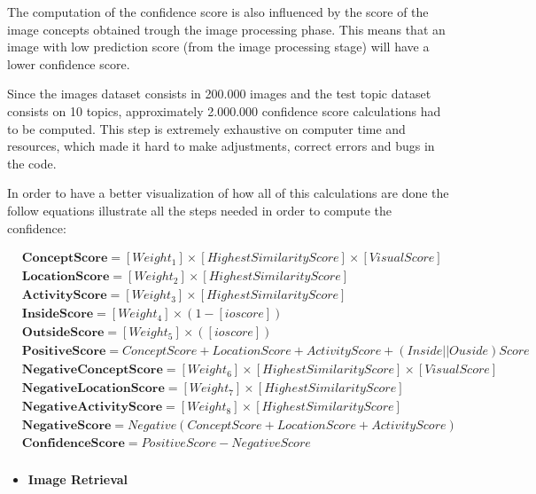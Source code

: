     The computation of the confidence score is also influenced by the score of the image concepts obtained trough the image processing phase. This means that an image with low prediction score (from the image processing stage) will have a lower confidence score. 

    Since the images dataset consists in 200.000 images and the test topic dataset consists on 10 topics, approximately 2.000.000 confidence score calculations had to be computed. This step is extremely exhaustive on computer time and resources, which made it hard to make adjustments, correct errors and bugs in the code.
        
   


    In order to have a better visualization of how all of this calculations are done the follow equations illustrate all the steps needed in order to compute the confidence:

    \begin{align*}
        &\textbf{ConceptScore}  =   [Weight_1]\times[HighestSimilarityScore]\times[VisualScore] \\ 
        &\textbf{LocationScore} = [Weight_2]\times[HighestSimilarityScore] \\ 
      &\textbf{ActivityScore} =  [Weight_3]\times[HighestSimilarityScore]\\
        &\textbf{InsideScore}   =  [Weight_4]\times(1-[ioscore])\\
        &\textbf{OutsideScore}  =  [Weight_5]\times([ioscore])\\
        &\textbf{PositiveScore}  =  ConceptScore + LocationScore + ActivityScore + (Inside||Ouside)Score\\
        &\textbf{NegativeConceptScore}  =  [Weight_6]\times[HighestSimilarityScore]\times[VisualScore]\\
        &\textbf{NegativeLocationScore}  =  [Weight_7]\times[HighestSimilarityScore]\\
        &\textbf{NegativeActivityScore}  =  [Weight_8]\times[HighestSimilarityScore]\\
        &\textbf{NegativeScore}  =  Negative(ConceptScore + LocationScore + ActivityScore) \\
        &\textbf{ConfidenceScore}  =  PositiveScore - NegativeScore\\
  \end{align*}
  

  \begin{itemize}
    \item \textbf{Image Retrieval}
  \end{itemize}


